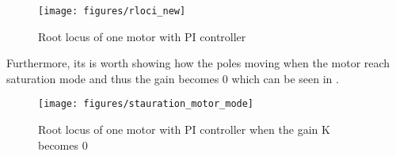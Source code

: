 \begin{figure}[H]
	\texttt{[image: figures/rloci\_new]}
	\caption{Root locus of one motor with PI controller}
	\label{fig:rlocus33}
\end{figure}
Furthermore, its is worth showing how the poles moving when the motor reach saturation mode and thus the gain becomes 0 which can be seen in .
\begin{figure}[H]
	\texttt{[image: figures/stauration\_motor\_mode]}
	\caption{Root locus of one motor with PI controller when the gain K becomes 0}
	\label{fig:rlocus44}
\end{figure}
